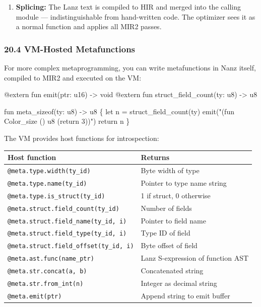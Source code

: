\documentclass[
  11pt,
]{article}
\newenvironment{Shaded}{\begin{snugshade}}{\end{snugshade}}
\newcommand{\NormalTok}[1]{#1}
\providecommand{\tightlist}{%
  \setlength{\itemsep}{0pt}\setlength{\parskip}{0pt}}
\begin{document}
\begin{enumerate}
\def\labelenumi{\arabic{enumi}.}
\setcounter{enumi}{2}
\tightlist
\item
  \textbf{Splicing:} The Lanz text is compiled to HIR and merged into
  the calling module --- indistinguishable from hand-written code. The
  optimizer sees it as a normal function and applies all MIR2 passes.
\end{enumerate}

\hypertarget{vm-hosted-metafunctions}{%
\subsubsection{20.4 VM-Hosted
Metafunctions}\label{vm-hosted-metafunctions}}

For more complex metaprogramming, you can write metafunctions in Nanz
itself, compiled to MIR2 and executed on the VM:

\begin{Shaded}
\begin{Highlighting}[]
\NormalTok{@extern fun emit(ptr: u16) {-}\textgreater{} void}
\NormalTok{@extern fun struct\_field\_count(ty: u8) {-}\textgreater{} u8}

\NormalTok{fun meta\_sizeof(ty: u8) {-}\textgreater{} u8 \{}
\NormalTok{    let n = struct\_field\_count(ty)}
\NormalTok{    emit("(fun Color\_size () u8 (return 3))")}
\NormalTok{    return n}
\NormalTok{\}}
\end{Highlighting}
\end{Shaded}

The VM provides host functions for introspection:

\begin{longtable}[]{@{}ll@{}}
\toprule\noalign{}
Host function & Returns \\
\midrule\noalign{}
\endhead
\bottomrule\noalign{}
\endlastfoot
\texttt{@meta.type.width(ty\_id)} & Byte width of type \\
\texttt{@meta.type.name(ty\_id)} & Pointer to type name string \\
\texttt{@meta.type.is\_struct(ty\_id)} & 1 if struct, 0 otherwise \\
\texttt{@meta.struct.field\_count(ty\_id)} & Number of fields \\
\texttt{@meta.struct.field\_name(ty\_id,\ i)} & Pointer to field name \\
\texttt{@meta.struct.field\_type(ty\_id,\ i)} & Type ID of field \\
\texttt{@meta.struct.field\_offset(ty\_id,\ i)} & Byte offset of
field \\
\texttt{@meta.ast.func(name\_ptr)} & Lanz S-expression of function
AST \\
\texttt{@meta.str.concat(a,\ b)} & Concatenated string \\
\texttt{@meta.str.from\_int(n)} & Integer as decimal string \\
\texttt{@meta.emit(ptr)} & Append string to emit buffer \\
\end{longtable}
\end{document}
